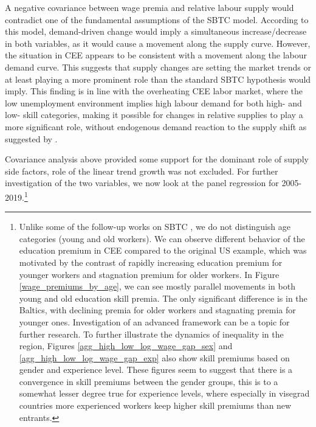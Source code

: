 \documentclass[11pt]{article}
\begin{document}
A negative covariance between wage premia and relative labour supply would contradict one of the fundamental assumptions of the SBTC model. According to this model, demand-driven change would imply a simultaneous increase/decrease in both variables, as it would cause a movement along the supply curve. However, the situation in CEE appears to be consistent with a movement along the labour demand curve. This suggests that supply changes are setting the market trends or at least playing a more prominent role than the standard SBTC hypothesis would imply. This finding is in line with the overheating  CEE labor market, where the low unemployment environment implies high labour demand for both high- and low- skill categories, making it possible for changes in relative supplies to play a more significant role,  without endogenous demand reaction to the supply shift as suggested by \citep{acemoglu2002directed}. %



Covariance analysis above provided some support for the dominant role of supply side factors, role of the linear trend growth was not excluded. For further investigation of the two variables, we now look at the panel regression for 2005-2019.\footnote{Unlike some of the follow-up works on SBTC \citep{card2001can}, we do not distinguish age categories (young and old workers). We can observe different behavior of the education premium in CEE compared to the original US example, which was motivated by the contrast of rapidly increasing education premium for younger workers and stagnation premium for older workers. In Figure \ref{wage_premiums_by_age}, we can see mostly parallel movements in both young and old education skill premia. The only significant difference is in the Baltics, with declining premia for older workers and stagnating premia for younger ones. Investigation of an advanced framework can be a topic for further research. To further illustrate the dynamics of inequality in the region, Figures \ref{agg_high_low_log_wage_gap_sex} and \ref{agg_high_low_log_wage_gap_exp} also show skill premiums based on gender and experience level. These figures seem to suggest that there is a convergence in skill premiums between the gender groups, this is to a somewhat lesser degree true for experience levels, where especially in visegrad countries more experienced workers keep higher skill premiums than new entrants.}   %
\end{document}
